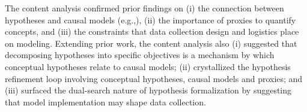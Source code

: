 \begin{comment}

\end{comment}

The content analysis confirmed prior findings on (i) the connection between
hypotheses and causal models (e.g.,\cite{mcelreath2020statistical}), (ii) the
importance of proxies to quantify concepts, and (iii) the constraints that data
collection design and logistics place on modeling. Extending prior work, the
content analysis also (i) suggested that decomposing hypotheses into specific
objectives is a mechanism by which conceptual hypotheses relate to causal
models; (ii) crystallized the hypothesis refinement loop involving conceptual
hypotheses, causal models and proxies; and (iii) surfaced the dual-search nature
of hypothesis formalization by suggesting that model implementation may shape
data collection. 

